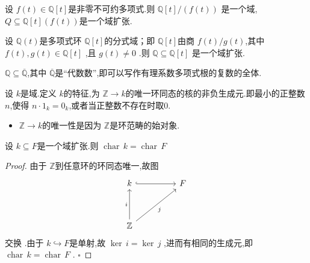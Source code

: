 \documentclass[lang=cn,12pt,color=green,fontset=none,pad]{elegantbook}
\begin{document}
\begin{example}
    设 $ f\left( t \right) \in \mathbb{Q} [t]  $是非零不可约多项式.则 $ \mathbb{Q}[t] / \left( f\left( t \right)  \right)  $  是一个域, $ Q\subseteq \mathbb{Q}[t]\left( f\left( t \right)  \right)  $是一个域扩张. 
\end{example}

\begin{example}
    设 $ \mathbb{Q}\left( t \right)  $是多项式环 $ \mathbb{Q}[t] $的分式域；即 $ \mathbb{Q} [t] $由商 $ f\left( t \right)/g\left( t \right)   $,其中 $ f\left( t \right),g\left( t \right)\in \mathbb{Q}[t]   $     ,且 $ g\left( t \right)\neq  0  $ .则 $ \mathbb{Q} \subseteq \mathbb{Q} [t] $  是一个域扩张. 
\end{example}

\begin{example}
     $ \mathbb{Q} \subseteq \overline{\mathbb{Q} } $,其中 $ \overline{\mathbb{Q} } $是“代数数”,即可以写作有理系数多项式根的复数的全体.  
\end{example}

\begin{definition}
    设 $ k $是域.定义 $ k $的特征,为 $ \mathbb{Z} \to k $的唯一环同态的核的非负生成元.即最小的正整数 $ n $,使得 $ n\cdot 1_{k}=0_{k} $,或者当正整数不存在时取0.   
\end{definition}

\begin{remark}
    \begin{itemize}
        \item  $ \mathbb{Z} \to  k  $的唯一性是因为 $ \mathbb{Z}  $是环范畴的始对象.  
    \end{itemize}
    
\end{remark}

\begin{lemma}
    设 $ k\subseteq F $是一个域扩张.则 $ \operatorname{char}\,k=\operatorname{char}\,F $  
\end{lemma}
\begin{proof}
    由于 $ \mathbb{Z}  $到任意环的环同态唯一,故图 
\[\begin{tikzcd}
	k && F \\
	\\
	{\mathbb{Z}}
	\arrow[hook, from=1-1, to=1-3]
	\arrow["i", from=3-1, to=1-1]
	\arrow["j"', from=3-1, to=1-3]
\end{tikzcd}\]交换 .由于 \( k\hookrightarrow F \)是单射,故 \(  \operatorname{ker}\,i=\operatorname{ker}\,j  \) ,进而有相同的生成元,即 \(  \operatorname{char}\,k=\operatorname{char}\,F  \) .
    \hfill $\square$
\end{proof}
\end{document}
